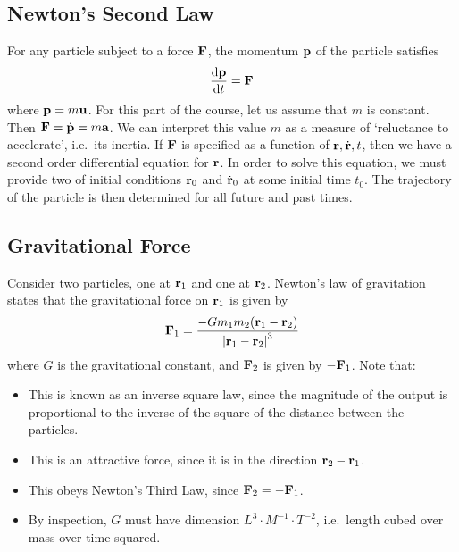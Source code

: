 \subsection{Newton's Second Law}
For any particle subject to a force \(\vb F\), the momentum \(\vb p\) of the particle satisfies
\[
	\frac{\dd \vb p}{\dd{t}} = \vb F
\]
where \(\vb p = m \vb u\).
For this part of the course, let us assume that \(m\) is constant.
Then \(\vb F = \dot{\vb p} = m \vb a\).
We can interpret this value \(m\) as a measure of `reluctance to accelerate', i.e.\ its inertia.
If \(\vb F\) is specified as a function of \(\vb r, \dot{\vb r}, t\), then we have a second order differential equation for \(\vb r\).
In order to solve this equation, we must provide two of initial conditions \(\vb r_0\) and \(\dot{\vb r}_0\) at some initial time \(t_0\).
The trajectory of the particle is then determined for all future and past times.

\subsection{Gravitational Force}
Consider two particles, one at \(\vb r_1\) and one at \(\vb r_2\).
Newton's law of gravitation states that the gravitational force on \(\vb r_1\) is given by
\[
	\vb F_1 = \frac{- G m_1 m_2 (\vb r_1 - \vb r_2)}{\abs{\vb r_1 - \vb r_2}^3}
\]
where \(G\) is the gravitational constant, and \(\vb F_2\) is given by \(-\vb F_1\).
Note that:
\begin{itemize}
	\item This is known as an inverse square law, since the magnitude of the output is proportional to the inverse of the square of the distance between the particles.
	\item This is an attractive force, since it is in the direction \(\vb r_2 - \vb r_1\).
	\item This obeys Newton's Third Law, since \(\vb F_2 = - \vb F_1\).
	\item By inspection, \(G\) must have dimension \(L^3 \cdot M^{-1} \cdot T^{-2}\), i.e.\ length cubed over mass over time squared.
\end{itemize}

